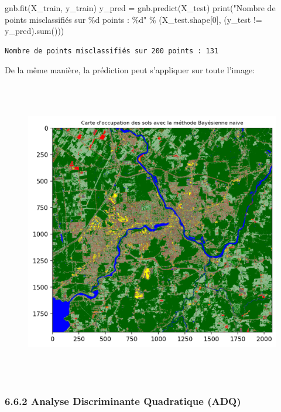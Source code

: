 \documentclass[
]{article}
\newenvironment{Shaded}{}{}
\newcommand{\BuiltInTok}[1]{\textcolor[rgb]{0.00,0.50,0.00}{#1}}
\newcommand{\DecValTok}[1]{\textcolor[rgb]{0.25,0.63,0.44}{#1}}
\newcommand{\NormalTok}[1]{#1}
\newcommand{\OperatorTok}[1]{\textcolor[rgb]{0.40,0.40,0.40}{#1}}
\newcommand{\SpecialCharTok}[1]{\textcolor[rgb]{0.25,0.44,0.63}{#1}}
\newcommand{\StringTok}[1]{\textcolor[rgb]{0.25,0.44,0.63}{#1}}
\begin{document}
\label{e321431e}
\label{cb45}
\begin{Shaded}
\begin{Highlighting}[]
\NormalTok{gnb.fit(X\_train, y\_train)}
\NormalTok{y\_pred }\OperatorTok{=}\NormalTok{ gnb.predict(X\_test)}
\BuiltInTok{print}\NormalTok{(}\StringTok{"Nombre de points misclassifiés sur }\SpecialCharTok{\%d}\StringTok{ points : }\SpecialCharTok{\%d}\StringTok{"}
  \OperatorTok{\%}\NormalTok{ (X\_test.shape[}\DecValTok{0}\NormalTok{], (y\_test }\OperatorTok{!=}\NormalTok{ y\_pred).}\BuiltInTok{sum}\NormalTok{()))}
\end{Highlighting}
\end{Shaded}

\begin{verbatim}
Nombre de points misclassifiés sur 200 points : 131
\end{verbatim}

De la même manière, la prédiction peut s'appliquer sur toute l'image:

\label{1b9ddbf0}
\begin{figure}
\centering
\includegraphics[width=5.625in,height=5.22917in]{05-ClassificationsSupervisees_files/figure-html/cell-44-output-1.png}
\caption{}
\end{figure}

\subsubsection{\texorpdfstring{{6.6.2} Analyse Discriminante Quadratique
(ADQ)}{6.6.2 Analyse Discriminante Quadratique (ADQ)}}\label{analyse-discriminante-quadratique-adq}
\end{document}
